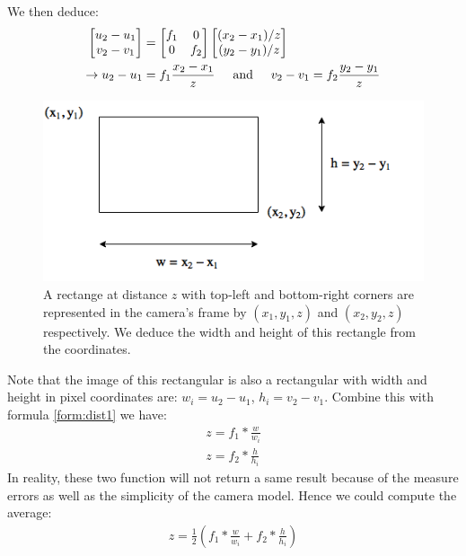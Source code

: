 We then deduce:
\begin{align}
	\begin{bmatrix}
		u_2 - u_1\\
		v_2 - v_1
	\end{bmatrix} &= \begin{bmatrix}
	f_1 & 0 \\
	0 & f_2 
\end{bmatrix} \begin{bmatrix}
(x_2 - x_1)/z\\
(y_2 - y_1)/z
\end{bmatrix} \nonumber\\
\label{form:dist1}
\rightarrow u_2 - u_1 &= f_1 \frac{x_2 - x_1}{z} \hspace{0.5cm} \text{and} \hspace{0.5cm} v_2 - v_1 = f_2 \frac{y_2 - y_1}{z} 
\end{align}

\begin{figure}[tb]
	\centering
	\includegraphics[width=0.6\hsize]{./figures/rectForm}
	\caption{A rectange at distance $z$ with top-left and bottom-right corners are represented in the camera's frame by $(x_1, y_1, z)$ and $(x_2, y_2, z)$ respectively. We deduce the width and height of this rectangle from the coordinates.}
	\label{fig:rectForm}
\end{figure}

Note that the image of this rectangular is also a rectangular with width and height in pixel coordinates are: $w_{i} = u_2 - u_1$, $h_{i} = v_2 - v_1$. Combine this with formula \ref{form:dist1} we have:
\begin{align}
\label{form:dist2}
z = f_1 * \frac{w}{w_i} \nonumber \\
z = f_2 * \frac{h}{h_i}
\end{align}
In reality, these two function will not return a same result because of the measure errors as well as the simplicity of the camera model. Hence we could compute the average:
\begin{align}
z = \frac{1}{2} (f_1 * \frac{w}{w_i} + f_2 * \frac{h}{h_i})
\end{align}

